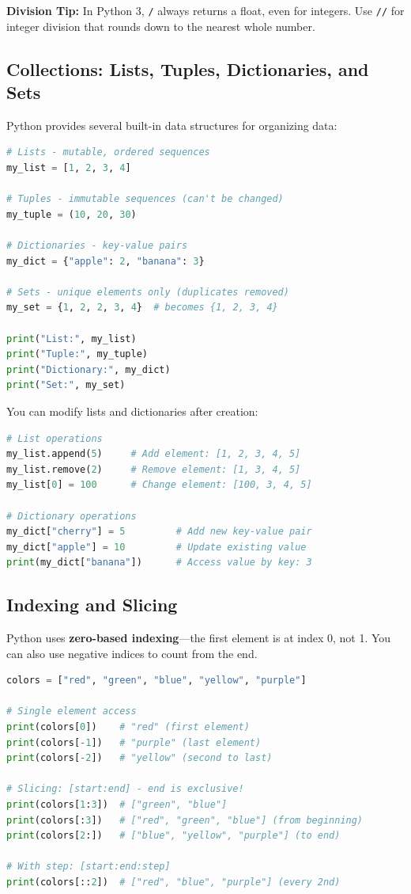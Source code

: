 \begin{info}
\textbf{Division Tip:} In Python 3, \texttt{/} always returns a float, even for integers. Use \texttt{//} for integer division that rounds down to the nearest whole number.
\end{info}

\subsection{Collections: Lists, Tuples, Dictionaries, and Sets}

Python provides several built-in data structures for organizing data:

\begin{lstlisting}[language=Python]
# Lists - mutable, ordered sequences
my_list = [1, 2, 3, 4]

# Tuples - immutable sequences (can't be changed)
my_tuple = (10, 20, 30)

# Dictionaries - key-value pairs
my_dict = {"apple": 2, "banana": 3}

# Sets - unique elements only (duplicates removed)
my_set = {1, 2, 2, 3, 4}  # becomes {1, 2, 3, 4}

print("List:", my_list)
print("Tuple:", my_tuple)
print("Dictionary:", my_dict)
print("Set:", my_set)
\end{lstlisting}

You can modify lists and dictionaries after creation:

\begin{lstlisting}[language=Python]
# List operations
my_list.append(5)     # Add element: [1, 2, 3, 4, 5]
my_list.remove(2)     # Remove element: [1, 3, 4, 5]
my_list[0] = 100      # Change element: [100, 3, 4, 5]

# Dictionary operations
my_dict["cherry"] = 5         # Add new key-value pair
my_dict["apple"] = 10         # Update existing value
print(my_dict["banana"])      # Access value by key: 3
\end{lstlisting}

\subsection{Indexing and Slicing}

Python uses \textbf{zero-based indexing}---the first element is at index 0, not 1. You can also use negative indices to count from the end.

\begin{lstlisting}[language=Python]
colors = ["red", "green", "blue", "yellow", "purple"]

# Single element access
print(colors[0])    # "red" (first element)
print(colors[-1])   # "purple" (last element)
print(colors[-2])   # "yellow" (second to last)

# Slicing: [start:end] - end is exclusive!
print(colors[1:3])  # ["green", "blue"]
print(colors[:3])   # ["red", "green", "blue"] (from beginning)
print(colors[2:])   # ["blue", "yellow", "purple"] (to end)

# With step: [start:end:step]
print(colors[::2])  # ["red", "blue", "purple"] (every 2nd)
\end{lstlisting}

